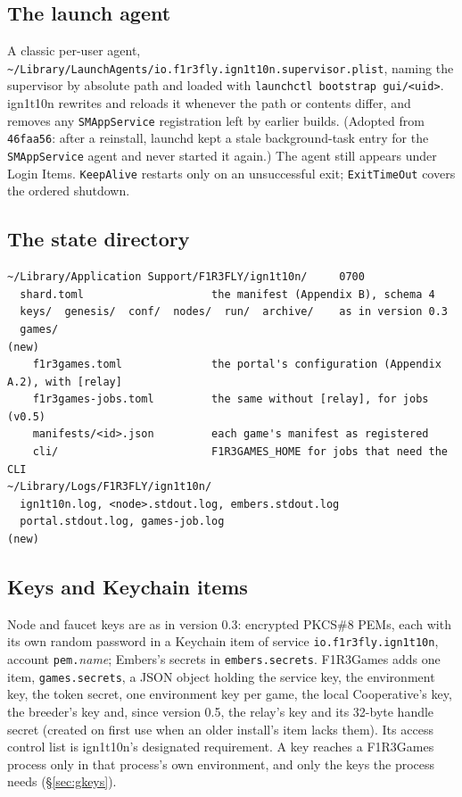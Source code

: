 \documentclass[11pt]{article}
\theoremstyle{definition}
\theoremstyle{remark}
\newcommand{\code}[1]{\texttt{#1}}
\newcommand{\Hr}{ign1t10n}
\newcommand{\Gm}{F1R3Games}
\newcommand{\Em}{Embers}
\begin{document}
\subsection{The launch agent}

A classic per-user agent, \code{\textasciitilde/Library/LaunchAgents/io.f1r3fly.ign1t10n.supervisor.plist},
naming the supervisor by absolute path and loaded with
\code{launchctl bootstrap gui/<uid>}. \Hr{} rewrites and reloads it whenever the path
or contents differ, and removes any \code{SMAppService} registration left by earlier
builds. (Adopted from \code{46faa56}: after a reinstall, launchd kept a stale
background-task entry for the \code{SMAppService} agent and never started it again.)
The agent still appears under Login Items. \code{KeepAlive} restarts only on an
unsuccessful exit; \code{ExitTimeOut} covers the ordered shutdown.

\subsection{The state directory}

\begin{lstlisting}
~/Library/Application Support/F1R3FLY/ign1t10n/     0700
  shard.toml                    the manifest (Appendix B), schema 4
  keys/  genesis/  conf/  nodes/  run/  archive/    as in version 0.3
  games/                                                                 (new)
    f1r3games.toml              the portal's configuration (Appendix A.2), with [relay]
    f1r3games-jobs.toml         the same without [relay], for jobs (v0.5)
    manifests/<id>.json         each game's manifest as registered
    cli/                        F1R3GAMES_HOME for jobs that need the CLI
~/Library/Logs/F1R3FLY/ign1t10n/
  ign1t10n.log, <node>.stdout.log, embers.stdout.log
  portal.stdout.log, games-job.log                                       (new)
\end{lstlisting}

\subsection{Keys and Keychain items}

Node and faucet keys are as in version 0.3: encrypted PKCS\#8 PEMs, each with its own
random password in a Keychain item of service \code{io.f1r3fly.ign1t10n}, account
\code{pem.}\textit{name}; \Em{}'s secrets in \code{embers.secrets}. \Gm{} adds one
item, \code{games.secrets}, a JSON object holding the service key, the environment
key, the token secret, one environment key per game, the local Cooperative's key, the
breeder's key and, since version 0.5, the relay's key and its 32-byte handle secret
(created on first use when an older install's item lacks them). Its access control list is \Hr{}'s designated requirement. A key
reaches a \Gm{} process only in that process's own environment, and only the keys the
process needs (\S\ref{sec:gkeys}).
\end{document}
